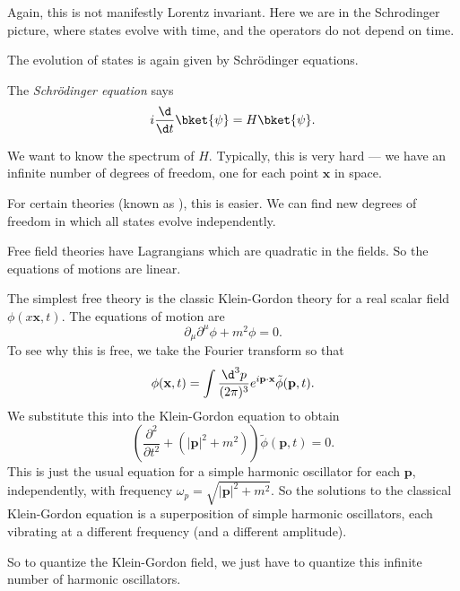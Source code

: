 \documentclass[a4paper]{article}
\begin{document}
Again, this is not manifestly Lorentz invariant. Here we are in the Schrodinger picture, where states evolve with time, and the operators do not depend on time.

The evolution of states is again given by Schr\"odinger equations.
\begin{defi}
  The \emph{Schr\"odinger equation} says
  \[
    i \frac{\d}{\d t}\bket{\psi} = H \bket{\psi}.
  \]
\end{defi}
We want to know the spectrum of $H$. Typically, this is very hard --- we have an infinite number of degrees of freedom, one for each point $\mathbf{x}$ in space.

For certain theories (known as ), this is easier. We can find new degrees of freedom in which all states evolve independently.

Free field theories have Lagrangians which are quadratic in the fields. So the equations of motions are linear.

\begin{eg}
  The simplest free theory is the classic Klein-Gordon theory for a real scalar field $\phi(x\mathbf{x}, t)$. The equations of motion are
  \[
    \partial_\mu \partial^\mu \phi + m^2 \phi = 0.
  \]
  To see why this is free, we take the Fourier transform so that
  \[
    \phi(\mathbf{x}, t) = \int \frac{\d^3 p}{(2\pi)^3} e^{i \mathbf{p}\cdot \mathbf{x}} \tilde{\phi}(\mathbf{p}, t).
  \]
  We substitute this into the Klein-Gordon equation to obtain
  \[
    \left(\frac{\partial^2}{\partial t^2} + (|\mathbf{p}|^2 + m^2)\right)\tilde{\phi}(\mathbf{p}, t) = 0.
  \]
  This is just the usual equation for a simple harmonic oscillator for each $\mathbf{p}$, independently, with frequency $\omega_p = \sqrt{|\mathbf{p}|^2 + m^2}$. So the solutions to the classical Klein-Gordon equation is a superposition of simple harmonic oscillators, each vibrating at a different frequency (and a different amplitude).

  So to quantize the Klein-Gordon field, we just have to quantize this infinite number of harmonic oscillators.
\end{eg}
\end{document}
